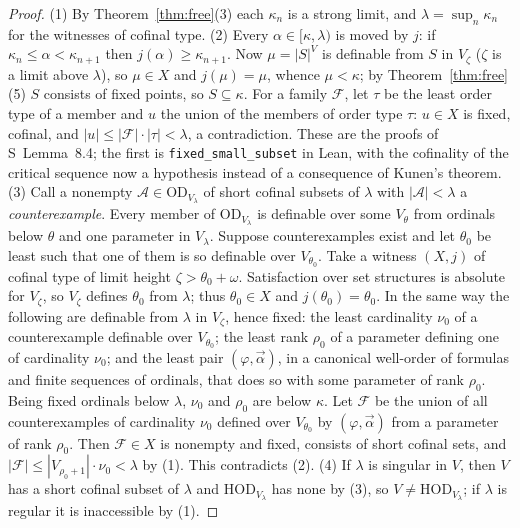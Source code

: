 \documentclass[11pt,letterpaper]{article}
\theoremstyle{definition}
\numberwithin{equation}{section}
\newcommand{\HOD}{\mathrm{HOD}}
\newcommand{\OD}{\mathrm{OD}}
\begin{document}
\begin{proof}
(1) By Theorem~\ref{thm:free}(3) each $\kappa_n$ is a strong limit, and $\lambda=\sup_n\kappa_n$ for the witnesses of cofinal type. (2) Every $\alpha\in[\kappa,\lambda)$ is moved by $j$: if $\kappa_n\le\alpha<\kappa_{n+1}$ then $j(\alpha)\ge\kappa_{n+1}$. Now $\mu=|S|^V$ is definable from $S$ in $V_\zeta$ ($\zeta$ is a limit above $\lambda$), so $\mu\in X$ and $j(\mu)=\mu$, whence $\mu<\kappa$; by Theorem~\ref{thm:free}(5) $S$ consists of fixed points, so $S\subseteq\kappa$. For a family $\mathcal F$, let $\tau$ be the least order type of a member and $u$ the union of the members of order type $\tau$: $u\in X$ is fixed, cofinal, and $|u|\le|\mathcal F|\cdot|\tau|<\lambda$, a contradiction. These are the proofs of S~Lemma~8.4; the first is \nolinkurl{fixed_small_subset} in Lean, with the cofinality of the critical sequence now a hypothesis instead of a consequence of Kunen's theorem.
(3) Call a nonempty $\mathcal A\in\OD_{V_\lambda}$ of short cofinal subsets of $\lambda$ with $|\mathcal A|<\lambda$ a \emph{counterexample}. Every member of $\OD_{V_\lambda}$ is definable over some $V_\theta$ from ordinals below $\theta$ and one parameter in $V_\lambda$. Suppose counterexamples exist and let $\theta_0$ be least such that one of them is so definable over $V_{\theta_0}$. Take a witness $(X,j)$ of cofinal type of limit height $\zeta>\theta_0+\omega$. Satisfaction over set structures is absolute for $V_\zeta$, so $V_\zeta$ defines $\theta_0$ from $\lambda$; thus $\theta_0\in X$ and $j(\theta_0)=\theta_0$. In the same way the following are definable from $\lambda$ in $V_\zeta$, hence fixed: the least cardinality $\nu_0$ of a counterexample definable over $V_{\theta_0}$; the least rank $\rho_0$ of a parameter defining one of cardinality $\nu_0$; and the least pair $(\varphi,\vec\alpha)$, in a canonical well-order of formulas and finite sequences of ordinals, that does so with some parameter of rank $\rho_0$. Being fixed ordinals below $\lambda$, $\nu_0$ and $\rho_0$ are below $\kappa$. Let $\mathcal F$ be the union of all counterexamples of cardinality $\nu_0$ defined over $V_{\theta_0}$ by $(\varphi,\vec\alpha)$ from a parameter of rank $\rho_0$. Then $\mathcal F\in X$ is nonempty and fixed, consists of short cofinal sets, and $|\mathcal F|\le|V_{\rho_0+1}|\cdot\nu_0<\lambda$ by (1). This contradicts (2). (4) If $\lambda$ is singular in $V$, then $V$ has a short cofinal subset of $\lambda$ and $\HOD_{V_\lambda}$ has none by (3), so $V\ne\HOD_{V_\lambda}$; if $\lambda$ is regular it is inaccessible by (1).
\end{proof}
\end{document}
